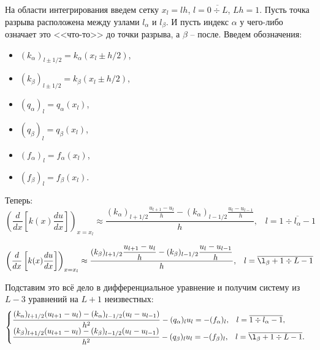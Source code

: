 		
		На области интегрирования введем сетку $x_l = lh$, $l = \overline{0 \div L}$, $Lh = 1$. Пусть точка разрыва расположена между узлами $l_\alpha$ и $l_\beta$. И пусть индекс $\alpha$ у чего-либо означает это <<что-то>> до точки разрыва, а $\beta$ -- после. Введем обозначения:
		\begin{itemize}
			\item $(k_\alpha)_{l \pm 1/2} = k_\alpha(x_l \pm h/2)$,
			
			\item $(k_\beta)_{l \pm 1/2} = k_\beta(x_l \pm h/2)$,
			
			\item $(q_\alpha)_l = q_\alpha(x_l)$,
			
			\item $(q_\beta)_l = q_\beta(x_l)$,
			
			\item $(f_\alpha)_l = f_\alpha(x_l)$,
			
			\item $(f_\beta)_l = f_\beta(x_l)$.
		\end{itemize}
		
		Теперь:
		\begin{equation*}
			\left(\frac{d}{dx}\left[k(x)\frac{du}{dx}\right]\right)_{x = x_l} \approx \frac{(k_\alpha)_{l+1/2}\displaystyle\frac{u_{l+1} - u_l}{h} - (k_\alpha)_{l-1/2}\displaystyle\frac{u_{l} - u_{l-1}}{h}}{h}, \;\;\; l = \overline{1 \div l_\alpha - 1}
		\end{equation*}
	
		\begin{equation*}
			\left(\frac{d}{dx}\left[k(x)\frac{du}{dx}\right]\right)_{x = x_l} \approx \frac{(k_\beta)_{l+1/2}\displaystyle\frac{u_{l+1} - u_l}{h} - (k_\beta)_{l-1/2}\displaystyle\frac{u_{l} - u_{l-1}}{h}}{h}, \;\;\; l = \overline{\l_\beta + 1 \div L - 1}
		\end{equation*}
	
		Подставим это всё дело в дифференциальное уравнение и получим систему из $L - 3$ уравнений на $L + 1$ неизвестных:
		\begin{equation*}
			\begin{cases}
				\displaystyle\frac{(k_\alpha)_{l+1/2}(u_{l+1} - u_l) - (k_\alpha)_{l-1/2}(u_{l} - u_{l-1})}{h^2} - (q_\alpha)_l u_l = -(f_\alpha)_l, \;\;\; l = \overline{1 \div l_\alpha - 1}, \\
				\displaystyle\frac{(k_\beta)_{l+1/2}(u_{l+1} - u_l) - (k_\beta)_{l-1/2}(u_{l} - u_{l-1})}{h^2} - (q_\beta)_l u_l = -(f_\beta)_l, \;\;\; l = \overline{\l_\beta + 1 \div L - 1}.
			\end{cases}
		\end{equation*}
	
